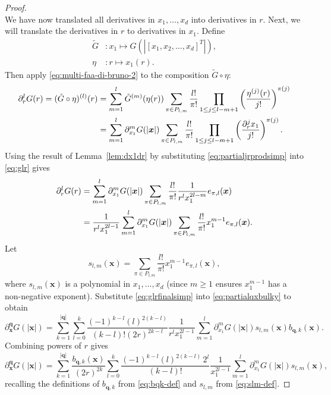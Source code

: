 \documentclass[12pt]{article}
\let\b=\boldsymbol
\def\risingfac#1#2{\left(#1\right)^{\overline{#2}}}
\theoremstyle{definition}
\theoremstyle{plain}
\theoremstyle{definition}
\begin{document}
\begin{proof}
\begin{equation}
\end{equation}
We have now translated all derivatives in $x_1, \dots, x_d$ into derivatives in $r$. Next, we will translate the derivatives in $r$ to derivatives in $x_1$. Define
\begin{align*}
  \tilde G &:  x_1 \mapsto G(|[x_1,x_2,\dots,x_d]^T|),\\
  \eta &: r \mapsto x_1(r).
\end{align*}
Then apply \eqref{eq:multi-faa-di-bruno-2} to the composition $\tilde G \circ \eta$:
\begin{align}
\label{eq:glr}
\partial^l_r G(r)  =
(\tilde G \circ \eta)^{(l)}(r)
&= \sum_{m=1}^l \tilde G^{(m)}(\eta(r)) \sum_{\pi \in P_{l,m}} \frac{l!}{\pi!} \prod_{1 \leq j \leq l-m+1} \left( \frac{\eta^{(j)}(r)}{j!} \right)^{\pi(j)}\\
&= \sum_{m=1}^l \partial^m_{x_1}G(|\b{x}|) \sum_{\pi \in P_{l,m}} \frac{l!}{\pi!} \prod_{1 \leq j \leq l-m+1} \left( \frac{\partial^j_r x_1}{j!} \right)^{\pi(j)}.\notag
\end{align}
Using the result of Lemma~\ref{lem:dx1dr} by substituting \eqref{eq:partialjrprodsimp} into \eqref{eq:glr} gives
\begin{align}
\partial^l_r G(r)
&= \sum_{m=1}^l \partial^m_{x_1}G(|\b{x}|) \sum_{\pi \in P_{l,m}} \frac{l!}{\pi!} \frac{1}{r^l x_1^{2l-m}} e_{\pi,l}(\b{x})\notag\\
&=  \frac{1}{r^l x_1^{2l-1}}\sum_{m=1}^l \partial^m_{x_1}G(|\b{x}|) \sum_{\pi \in P_{l,m}} \frac{l!}{\pi!} x_1^{m-1} e_{\pi,l}(\b{x}).
\label{eq:glrfinalsimp}
\end{align}
Let
\begin{equation}
\label{eq:slm-def}
s_{l,m}(\b{x})=\sum_{\pi \in P_{l,m}} \frac{l!}{\pi!} x_1^{m-1} e_{\pi,l}(\b{x}),
\end{equation}
where $s_{l,m}(\b{x})$ is a polynomial in $x_1, \dots, x_d$ (since $m \geq 1$ ensures $x_1^{m-1}$ has a non-negative exponent). Substitute \eqref{eq:glrfinalsimp} into \eqref{eq:partialqxbulky} to obtain
\[
\partial^{\b{q}}_{\b{x}} G(|\b{x}|) =\sum_{k=1}^{|\b{q}|} \sum_{l=0}^k \frac{(-1)^{k-l}\risingfac{l}{2(k-l)}}{(k-l)!(2 r)^{2k-l}} \frac{1}{r^l x_1^{2l-1}}\sum_{m=1}^l \partial^m_{x_1}G(|\b{x}|) s_{l,m} (\b{x}) b_{\b{q},k}(\b{x}) .
\]
Combining powers of $r$ gives
\begin{equation}
\label{eq:final1}
\partial^{\b{q}}_{\b{x}} G(|\b{x}|) =\sum_{k=1}^{|\b{q}|}\frac{b_{\b{q},k}(\b{x}) }{(2 r)^{2k}} \sum_{l=0}^k \frac{(-1)^{k-l}\risingfac{l}{2(k-l)} \, 2^l}{(k-l)!} \frac{1}{x_1^{2l-1}}   \sum_{m=1}^l \partial^m_{x_1}G(|\b{x}|) s_{l,m} (\b{x}),
\end{equation}
recalling the definitions of $b_{\b q,k}$ from \eqref{eq:bqk-def} and $s_{l,m}$ from \eqref{eq:slm-def}.


\end{proof}
\end{document}
